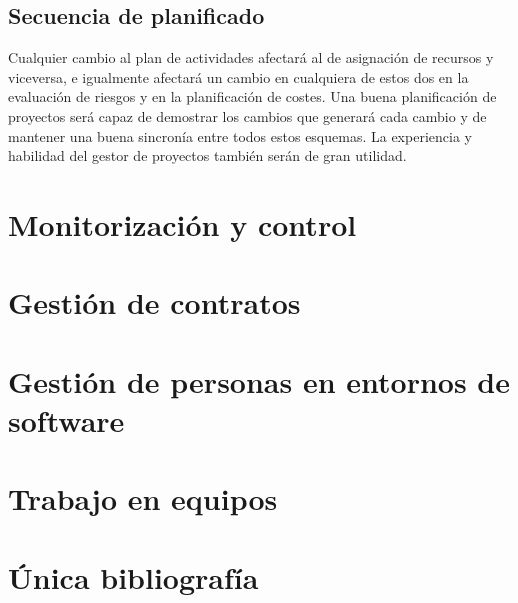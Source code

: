 \documentclass[12pt]{article}
\begin{document}
\subsection{Secuencia de planificado}
\label{8.10.0}

{Cualquier cambio al plan de actividades afectará al de asignación de recursos y viceversa, e igualmente afectará un cambio en cualquiera de estos dos en la evaluación de riesgos y en la planificación de costes. Una buena planificación de proyectos será capaz de demostrar los cambios que generará cada cambio y de mantener una buena sincronía entre todos estos esquemas. La experiencia y habilidad del gestor de proyectos también serán de gran utilidad.}

\newpage
\section{Monitorización y control}
\label{9.0.0}


\newpage
\section{Gestión de contratos}
\label{10.0.0}


\newpage
\section{Gestión de personas en entornos de software}
\label{11.0.0}


\newpage
\section{Trabajo en equipos}
\label{12.0.0}


\newpage
\section{Única bibliografía}
\label{bibliografia}
\nocite{*}
\begingroup
\renewcommand{\section}[2]{}%
\printbibliography
\endgroup
\end{document}
